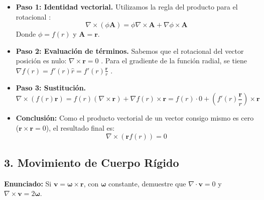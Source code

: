 \documentclass[a4paper]{article}
\begin{document}
\begin{itemize}
    \item \textbf{Paso 1: Identidad vectorial.} Utilizamos la regla del producto para el rotacional \cite{98, 109}:
    \begin{equation}
        \nabla \times (\phi \mathbf{A}) = \phi \nabla \times \mathbf{A} + \nabla \phi \times \mathbf{A}
    \end{equation}
    Donde $\phi = f(r)$ y $\mathbf{A} = \mathbf{r}$.
    \item \textbf{Paso 2: Evaluación de términos.} 
    Sabemos que el rotacional del vector posición es nulo: $\nabla \times \mathbf{r} = 0$ \cite{109}. 
    Para el gradiente de la función radial, se tiene $\nabla f(r) = f'(r) \hat{r} = f'(r) \frac{\mathbf{r}}{r}$ \cite{82}.
    \item \textbf{Paso 3: Sustitución.}
    \begin{equation}
        \nabla \times (f(r) \mathbf{r}) = f(r) (\nabla \times \mathbf{r}) + \nabla f(r) \times \mathbf{r} = f(r) \cdot 0 + \left( f'(r) \frac{\mathbf{r}}{r} \right) \times \mathbf{r}
    \end{equation}
    \item \textbf{Conclusión:} Como el producto vectorial de un vector consigo mismo es cero ($\mathbf{r} \times \mathbf{r} = 0$), el resultado final es:
    \begin{equation}
        \nabla \times (\mathbf{r} f(r)) = 0
    \end{equation}
\end{itemize}

\subsection*{3. Movimiento de Cuerpo Rígido}
\textbf{Enunciado:} Si $\mathbf{v} = \mathbf{\omega} \times \mathbf{r}$, con $\mathbf{\omega}$ constante, demuestre que $\nabla \cdot \mathbf{v} = 0$ y $\nabla \times \mathbf{v} = 2\mathbf{\omega}$.
\end{document}
